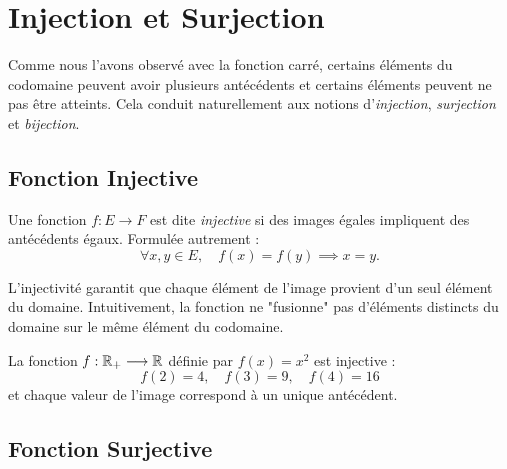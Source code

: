 
\section{Injection et Surjection}

Comme nous l'avons observé avec la fonction carré, certains éléments du codomaine peuvent avoir plusieurs antécédents et certains éléments peuvent ne pas être atteints. Cela conduit naturellement aux notions d'\emph{injection}, \emph{surjection} et \emph{bijection}.


\subsection{Fonction Injective}

\begin{definition}
    Une fonction $f : E \longrightarrow F$ est dite \emph{injective} si des images égales impliquent des antécédents égaux. Formulée autrement :
    \[
        \forall x,y \in E, \quad f(x) = f(y) \implies x = y.
    \]
\end{definition}

\begin{remark}
    L'injectivité garantit que chaque élément de l'image provient d'un seul élément du domaine. Intuitivement, la fonction ne "fusionne" pas d'éléments distincts du domaine sur le même élément du codomaine.
\end{remark}

\begin{example}
    La fonction $f : \mathbb{R}_+ \longrightarrow \mathbb{R}$ définie par $f(x) = x^2$ est injective :
    \[
        f(2) = 4, \quad f(3) = 9, \quad f(4) = 16
    \]
    et chaque valeur de l'image correspond à un unique antécédent.
\end{example}


\subsection{Fonction Surjective}

